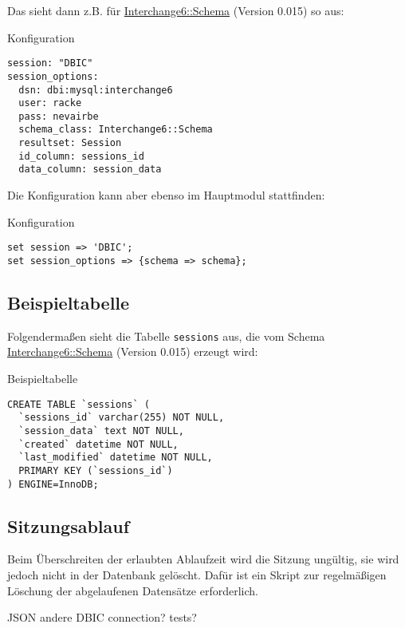 Das sieht dann z.B. für \href{https://metacpan.org/pod/Interchange6::Schema}{Interchange6::Schema} (Version 0.015) so aus:

\begin{frame}[fragile]{Konfiguration}
\begin{lstlisting}
session: "DBIC"
session_options:
  dsn: dbi:mysql:interchange6
  user: racke
  pass: nevairbe
  schema_class: Interchange6::Schema
  resultset: Session
  id_column: sessions_id
  data_column: session_data
\end{lstlisting}
\end{frame}

Die Konfiguration kann aber ebenso im Hauptmodul
stattfinden:

\begin{frame}[fragile]{Konfiguration}
\begin{lstlisting}
set session => 'DBIC';
set session_options => {schema => schema};
\end{lstlisting}
\end{frame}

\subsection{Beispieltabelle}

Folgendermaßen sieht die Tabelle \verb|sessions| aus,
die vom Schema \href{https://metacpan.org/pod/Interchange6::Schema}{Interchange6::Schema} (Version 0.015)
erzeugt wird:

\begin{frame}[fragile]{Beispieltabelle}
\begin{lstlisting}
CREATE TABLE `sessions` (
  `sessions_id` varchar(255) NOT NULL,
  `session_data` text NOT NULL,
  `created` datetime NOT NULL,
  `last_modified` datetime NOT NULL,
  PRIMARY KEY (`sessions_id`)
) ENGINE=InnoDB;
\end{lstlisting}
\end{frame}

\subsection{Sitzungsablauf}

Beim Überschreiten der erlaubten Ablaufzeit wird die Sitzung
ungültig, sie wird jedoch nicht in der Datenbank gelöscht.
Dafür ist ein Skript zur regelmäßigen Löschung der
abgelaufenen Datensätze erforderlich.

JSON
andere DBIC connection?
tests?


